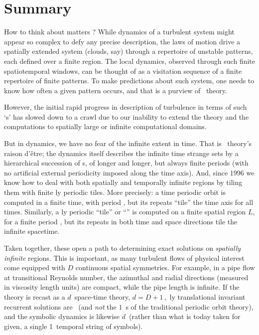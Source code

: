 

\section{Summary}
\label{s:summary}


How to think about matters {\spt}?
While dynamics of a turbulent system might appear so
complex to defy any precise description,
the laws of motion drive a spatially extended system (clouds, say) through a
repertoire of unstable patterns, each defined over a finite  {\spt}
region.
The local dynamics, observed through such
finite spatiotemporal windows, can be thought of as a visitation
sequence of a finite repertoire of finite patterns.
To make
predictions about such system,  one needs to know how often a given
pattern  occurs, and that is a purview of \po\ theory.

However, the initial rapid progress in description of turbulence in terms
of such `{\ecs}s' has slowed down to a crawl due
to our inability to extend the theory and the computations to
spatially large or infinite computational domains.

But in dynamics, we have no fear of the infinite extent in time. That is \po\
theory's raison d'\^{e}tre; the dynamics itself describes the
infinite time strange sets by a hierarchical succession of \po s, of longer
and longer, but always finite periods (with no artificial external
periodicity imposed along the time axis). And, since 1996 we know how to deal
with both spatially and temporally infinite regions by tiling them with
finite {\spt}ly periodic tiles\rf{Christiansen97,GHCW07}. More
precisely: a time periodic orbit is computed in a finite time, with period
\period{}, but its repeats ``tile'' the time axis for all times. Similarly, a
{\spt}ly periodic ``tile'' or ``\twot'' is computed on a finite
spatial region $L$, for a finite period \period{}, but its repeats in both
time and space directions tile the infinite spacetime.

Taken together, these open a path to determining exact solutions on
\emph{spatially infinite} regions.
This is important, as many turbulent flows of physical interest come equipped
with $D$ continuous spatial symmetries. For example, in a pipe flow at
transitional Reynolds number, the azimuthal and radial directions (measured
in viscosity length units) are compact, while the pipe length is infinite.
If the theory is recast as a $d$\dmn\ space-time theory,
\(d= D +1\,,\)
{\spt}ly translational invariant recurrent solutions are \dtors\
(and \emph{not} the $1$\dmn\ \po s of the traditional periodic orbit theory),
and the symbolic dynamics is likewise $d$\dmn\ (rather than what is
today taken for given, a single 1\dmn\ temporal string of symbols).

